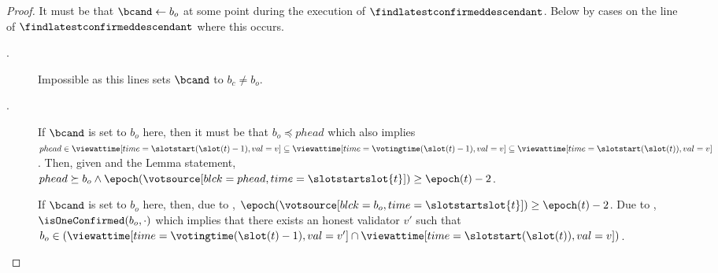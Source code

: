 \documentclass{article}
\begin{document}
\begin{proof}
    It must be that $\bcand \gets b_o$ at some point during the execution of   $\findlatestconfirmeddescendant$.
    Below by cases on the line  of $\findlatestconfirmeddescendant$ where this occurs.
    \begin{description}
        \item[.]  Impossible as this lines sets $\bcand$ to $b_c \neq b_o$.
        \item[.] 
        If $\bcand$ is set to $b_o$ here, then it must be that $b_o \preceq phead$ which also implies $phead \in \viewattime[time=\slotstart(\slot(t)-1),val=v] \subseteq \viewattime[time=\votingtime(\slot(t)-1),val=v] \subseteq \viewattime[time=\slotstart(\slot(t)),val=v]$.
        Then, given  and the Lemma statement, $phead \succeq b_o \land \epoch(\votsource[blck=phead, time={\slotstartslot{t}}]) \geq \epoch({t}) - 2$.
        \item[] If $\bcand$ is set to $b_o$ here, then, due to , $\epoch(\votsource[blck=b_o, time={\slotstartslot{t}}]) \geq \epoch(t) - 2$.
        Due to , $\isOneConfirmed(b_o, \cdot)$ which implies that there exists an honest validator $v'$ such that
        $b_o \in \left(\viewattime[time=\votingtime(\slot(t)-1),val=v']\cap \viewattime[time=\slotstart(\slot(t)),val=v]\right)$.
    \end{description}
\end{proof}

\end{document}
